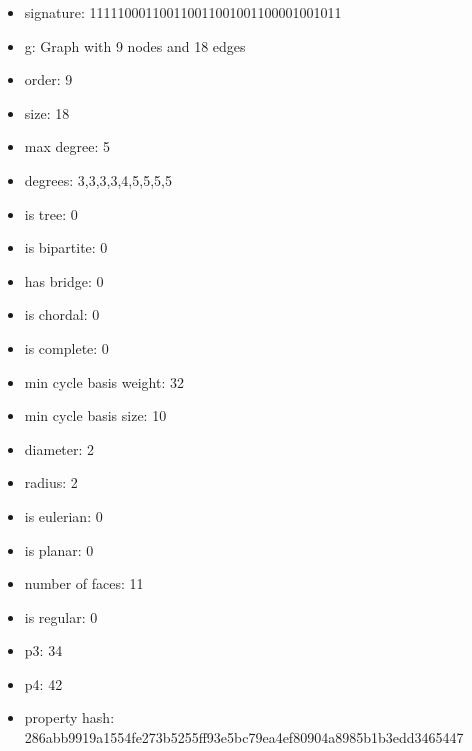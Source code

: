 \newpage
\begin{figure}
\end{figure}
\begin{itemize}
\item signature: 111110001100110011001001100001001011
\item g: Graph with 9 nodes and 18 edges
\item order: 9
\item size: 18
\item max degree: 5
\item degrees: 3,3,3,3,4,5,5,5,5
\item is tree: 0
\item is bipartite: 0
\item has bridge: 0
\item is chordal: 0
\item is complete: 0
\item min cycle basis weight: 32
\item min cycle basis size: 10
\item diameter: 2
\item radius: 2
\item is eulerian: 0
\item is planar: 0
\item number of faces: 11
\item is regular: 0
\item p3: 34
\item p4: 42
\item property hash: 286abb9919a1554fe273b5255ff93e5bc79ea4ef80904a8985b1b3edd3465447
\end{itemize}
